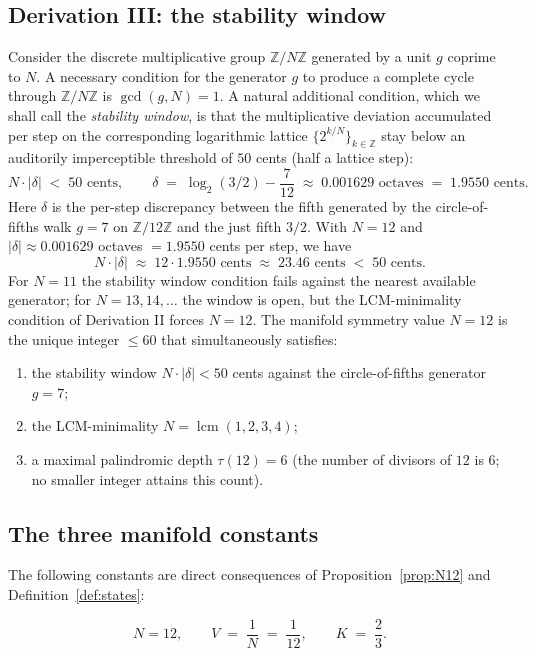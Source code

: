 \documentclass[11pt,a4paper]{article}
\theoremstyle{definition}
\theoremstyle{remark}
\newcommand{\Z}{\mathbb{Z}}
\DeclareMathOperator{\lcm}{lcm}
\begin{document}
\subsection{Derivation III: the stability window}

Consider the discrete multiplicative group $\Z/N\Z$ generated by a unit $g$ coprime to $N$. A necessary condition for the generator $g$ to produce a complete cycle through $\Z/N\Z$ is $\gcd(g,N)=1$. A natural additional condition, which we shall call the \emph{stability window}, is that the multiplicative deviation accumulated per step on the corresponding logarithmic lattice $\{2^{k/N}\}_{k\in\Z}$ stay below an auditorily imperceptible threshold of $50$ cents (half a lattice step):
\[
N\cdot|\delta| \;<\; 50 \text{ cents}, \qquad \delta \;=\; \log_{2}(3/2) - \frac{7}{12} \;\approx\; 0.001629\text{ octaves} \;=\; 1.9550\text{ cents}.
\]
Here $\delta$ is the per-step discrepancy between the fifth generated by the circle-of-fifths walk $g=7$ on $\Z/12\Z$ and the just fifth $3/2$. With $N=12$ and $|\delta| \approx 0.001629$ octaves $= 1.9550$ cents per step, we have
\[
N\cdot|\delta| \;\approx\; 12\cdot 1.9550\text{ cents} \;\approx\; 23.46 \text{ cents} \;<\; 50 \text{ cents}.
\]
For $N=11$ the stability window condition fails against the nearest available generator; for $N=13,14,\ldots$ the window is open, but the LCM-minimality condition of Derivation II forces $N=12$. The manifold symmetry value $N=12$ is the unique integer $\le 60$ that simultaneously satisfies:
\begin{enumerate}[leftmargin=*,label=(\roman*)]
\item the stability window $N\cdot|\delta|<50$ cents against the circle-of-fifths generator $g=7$;
\item the LCM-minimality $N=\lcm(1,2,3,4)$;
\item a maximal palindromic depth $\tau(12)=6$ (the number of divisors of $12$ is $6$; no smaller integer attains this count).
\end{enumerate}

\subsection{The three manifold constants}\label{subsec:constants}

The following constants are direct consequences of Proposition~\ref{prop:N12} and Definition~\ref{def:states}:

\begin{equation}\label{eq:constants}
\boxed{\;N = 12, \qquad V \;=\; \frac{1}{N} \;=\; \frac{1}{12}, \qquad K \;=\; \frac{2}{3}.\;}
\end{equation}
\end{document}
